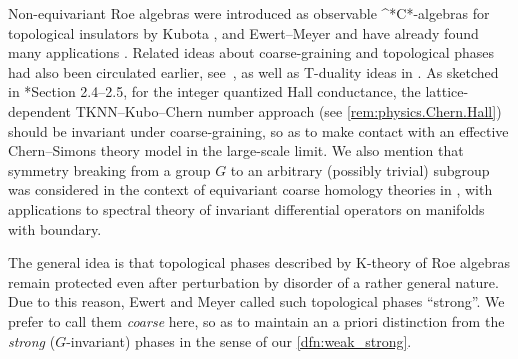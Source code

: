 \documentclass{amsart}
\numberwithin{figure}{section}
\numberwithin{equation}{section}
\numberwithin{table}{section}
\theoremstyle{plain}
\theoremstyle{definition}
\theoremstyle{remark}
\theoremstyle{nonumber}
\newcommand{\Cst}{\relax\ifmmode\mathrm{C}^*\else\textup{C*}\fi}
\begin{document}
Non-equivariant Roe algebras were introduced as observable \Cst-algebras
for topological insulators by Kubota
\cite{Kubota:Controlled_topological_phases}, and Ewert--Meyer
\cite{Ewert-Meyer:Coarse_geometry} and have already found many
applications
\cites{Ludewig-Thiang:Gapless_hyperbolic_half-plane,Ludewig-Thiang:Large-scale_obstructs_localization,Ludewig-Thiang:Quantization_coarse_cohomology,Kubota-Ludewig-Thiang:Delocalized_helical_surfaces,Kordyukov-Manuilov:Vanishing_theorem_magnetic,Rossi-Panati:Algebraic_localization_Roe_triviality,Ludewig-Thiang:Large-scale_quantization_1}.
Related ideas about coarse-graining and topological phases had also been
circulated earlier,
see~, as well as T-duality ideas in \cite{Mathai-Thiang:T-duality}. As sketched in \cite{Witten:Lectures_on_topological_phases}*{Section 2.4--2.5}, for the integer quantized Hall conductance, the lattice-dependent TKNN--Kubo--Chern number \cite{TKNN:Quantized_Hall_conductance} approach (see \cref{rem:physics.Chern.Hall}) should be invariant under coarse-graining, so as to make contact with an effective Chern--Simons theory model in the large-scale limit. We also mention that symmetry breaking from a group $G$
to an arbitrary (possibly trivial) subgroup was considered in the context
of equivariant coarse homology theories in
\cite{Bunke-Ludewig:Breaking_symmetries}, with applications to spectral
theory of invariant differential operators on manifolds with boundary.

The general idea is that topological phases described by K-theory of 
Roe algebras remain protected even after
perturbation by disorder of a rather general nature. 
Due to this reason, Ewert and Meyer called such topological phases
``strong''. We prefer to call them \emph{coarse} here, so as to
maintain an a priori distinction from the \emph{strong} (\( G\)-invariant) phases in the sense of our \cref{dfn:weak_strong}.
\end{document}
